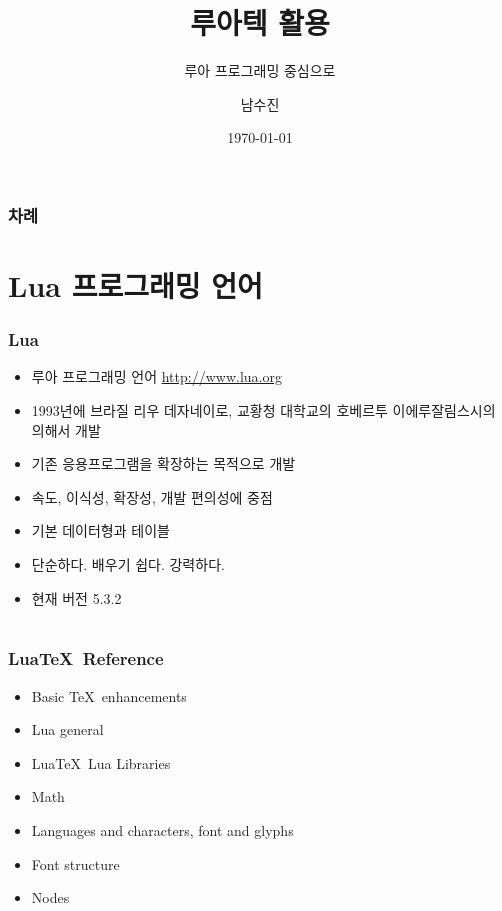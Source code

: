 \documentclass{beamer}
\title{루아텍 활용}
\subtitle{루아 프로그래밍 중심으로}
\author{남수진}
\date{\today}
\institute{
  2016 한국텍학회 학술대회 및 정기총회 \\
  고려대학교 하나과학관 206호}
\def\luatex{\hologo{LuaTeX}}
\begin{document}
\begin{frame}
  \titlepage
\end{frame}

\begin{frame}[t]
  \frametitle{차례}
  \tableofcontents
\end{frame}

\section{Lua 프로그래밍 언어}

\begin{frame}
  \frametitle{Lua}
  \begin{itemize}
  \item 루아 프로그래밍 언어 \url{http://www.lua.org}
  \item 1993년에 브라질 리우 데자네이로, 교황청 대학교의
    호베르투 이에루잘림스시의 의해서 개발
  \item 기존 응용프로그램을 확장하는 목적으로 개발
  \item 속도, 이식성, 확장성, 개발 편의성에 중점
  \item 기본 데이터형과 테이블
  \item 단순하다. 배우기 쉽다. 강력하다.
  \item 현재 버전 5.3.2
  \end{itemize}
\end{frame}

\section{\luatex}

\begin{frame}
  \frametitle{Lua\TeX\ Reference}
  \begin{itemize}
  \item Basic \TeX\ enhancements
  \item Lua general
  \item Lua\TeX\ Lua Libraries
  \item Math
  \item Languages and characters, font and glyphs
  \item Font structure
  \item Nodes
  \end{itemize}
\end{frame}
\end{document}
